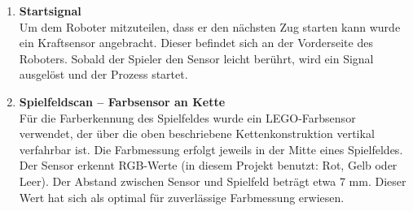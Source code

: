 \begin{enumerate}
	\item \textbf{Startsignal}\\
	Um dem Roboter mitzuteilen, dass er den nächsten Zug starten kann wurde ein Kraftsensor angebracht. Dieser befindet sich an der Vorderseite des Roboters. Sobald der Spieler den Sensor leicht berührt, wird ein Signal ausgelöst und der Prozess startet. 
	\item \textbf{Spielfeldscan – Farbsensor an Kette}\\
	 Für die Farberkennung des Spielfeldes wurde ein LEGO-Farbsensor verwendet, der über die oben beschriebene Kettenkonstruktion vertikal verfahrbar ist. Die Farbmessung erfolgt jeweils in der Mitte eines Spielfeldes. Der Sensor erkennt RGB-Werte (in diesem Projekt benutzt: Rot, Gelb oder Leer). Der Abstand zwischen Sensor und Spielfeld beträgt etwa 7 mm. Dieser Wert hat sich als optimal für zuverlässige Farbmessung erwiesen.
\end{enumerate}


